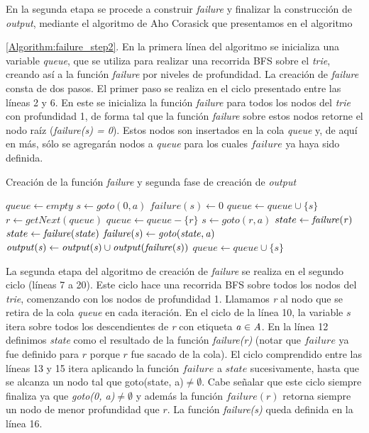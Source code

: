 En la segunda etapa se procede a construir {\it failure} y finalizar la construcción de {\it output}, mediante el algoritmo de Aho  Corasick \cite{AC75} que presentamos en el algoritmo {\ref{Algorithm:failure_step2}.
En la primera línea del algoritmo se inicializa una variable {\it queue}, que se utiliza para realizar una recorrida BFS sobre el \emph{trie}, creando así a la función {\it failure} por niveles de profundidad. La creación de {\it failure} consta de dos pasos. El primer paso se realiza en el ciclo presentado entre las líneas 2 y 6. En este se inicializa la función {\it failure} para todos los nodos del \emph{trie} con profundidad 1, de forma tal que la función {\it failure} sobre estos nodos retorne el nodo raíz ({\it failure(s) = 0}). Estos nodos son insertados en la cola {\it queue} y, de aquí en más, sólo se agregarán nodos a {\it queue} para los cuales $failure$ ya haya sido definida.
\begin{algorithm}[h]
\small
\caption{Creación de la función {\it failure} y segunda fase de creación de {\it output} }
\label{Algorithm:failure_step2}
\begin{algorithmic}[1]
\State $queue \gets empty$
	\State $s \gets goto(0,a)$
	\State $failure(s) \gets 0$
	\State $queue \gets queue \cup \{s\}$	
\EndFor
{}
	\State $r \gets getNext(queue)$	
	\State $queue \gets queue - \{r\}$
		\State $s \gets goto(r,a)$
		\State $state \gets {\it failure(r)}$	
			\State $state \gets {\it failure(state)}$
		\EndWhile
		\State ${\it failure(s)} \gets {\it goto(state,a)}$
		\State ${\it output(s)} \gets {\it output(s)} \cup {\it output({\it failure(s)})}$
		\State $queue \gets queue \cup \{s\}$	
	\EndFor
\EndWhile
\Statex
\end{algorithmic}
  \vspace{-0.4cm}%
\end{algorithm}
La segunda etapa del algoritmo de creación de {\it failure} se realiza en el segundo ciclo (líneas 7 a 20). Este ciclo hace una recorrida BFS sobre todos los nodos del \emph{trie}, comenzando con los nodos de profundidad 1. Llamamos {\it r} al nodo que se retira de la cola {\it queue} en cada iteración. En el ciclo de la línea 10, la variable $s$ itera sobre todos los descendientes de {\it r} con etiqueta ${\it a} \in {\it A}$. En la línea 12 definimos {\it state} como el resultado de la función {\it failure(r)} (notar que $failure$ ya fue definido para $r$ porque $r$ fue sacado de la cola). El ciclo comprendido entre las líneas 13 y 15 itera aplicando la función $failure$ a $state$ sucesivamente, hasta que se alcanza un nodo tal que goto(state, a)$\not= \emptyset$. Cabe señalar que este ciclo siempre finaliza ya que {\it goto(0, a)$\not= \emptyset$ } y además la función $failure(r)$ retorna siempre un nodo de menor profundidad que $r$. La función {\it failure(s)} queda definida en la línea 16.\\
}

